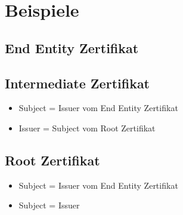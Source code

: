 \chapter{Beispiele}
\section{End Entity Zertifikat}

    

    

    

    

    


\section{Intermediate Zertifikat}

    \begin{itemize}
        \item Subject = Issuer vom End Entity Zertifikat
    \end{itemize}
    

    

    \begin{itemize}
        \item Issuer = Subject vom Root Zertifikat
    \end{itemize}
    


\section{Root Zertifikat}

    \begin{itemize}
        \item Subject = Issuer vom End Entity Zertifikat
        \item Subject = Issuer
    \end{itemize}
    

